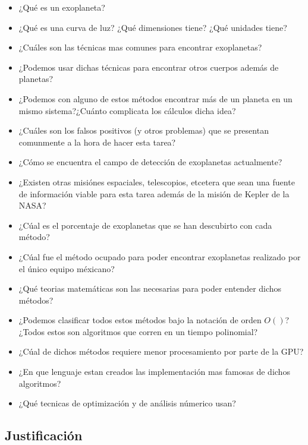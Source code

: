 \documentclass[fleqn, journal]{IEEEtran}                        %
\theoremstyle{break}                                            %
\begin{document}
        \begin{itemize}
            \item ¿Qué es un exoplaneta?
            \item ¿Qué es una curva de luz? ¿Qué dimensiones tiene? ¿Qué unidades tiene?
            \item ¿Cuáles son las técnicas mas comunes para encontrar exoplanetas?
            \item ¿Podemos usar dichas técnicas para encontrar otros cuerpos además de planetas?
            \item ¿Podemos con alguno de estos métodos encontrar más de un planeta en un mismo sistema?¿Cuánto complicata
                los cálculos dicha idea?
            \item ¿Cuáles son los falsos positivos (y otros problemas) que se presentan comunmente a la hora
                de hacer esta tarea?
            \item ¿Cómo se encuentra el campo de detección de exoplanetas actualmente?
            \item ¿Existen otras misiónes espaciales, telescopios, etcetera que sean una fuente de información viable
                para esta tarea además de la misión de Kepler de la NASA?
            \item ¿Cúal es el porcentaje de exoplanetas que se han descubirto con cada método?
            \item ¿Cúal fue el método ocupado para poder encontrar exoplanetas realizado por el único equipo
                méxicano?
            \item ¿Qué teorias matemáticas son las necesarias para poder entender dichos métodos?
            \item ¿Podemos clasificar todos estos métodos bajo la notación de orden $O()$?
                ¿Todos estos son algoritmos que corren en un tiempo polinomial?
            \item ¿Cúal de dichos métodos requiere menor procesamiento por parte de la GPU?
            \item ¿En que lenguaje estan creados las implementación mas famosas de dichos algoritmos?
            \item ¿Qué tecnicas de optimización y de análisis númerico usan?
        \end{itemize}


    \subsection{Justificación}
        
\end{document}
